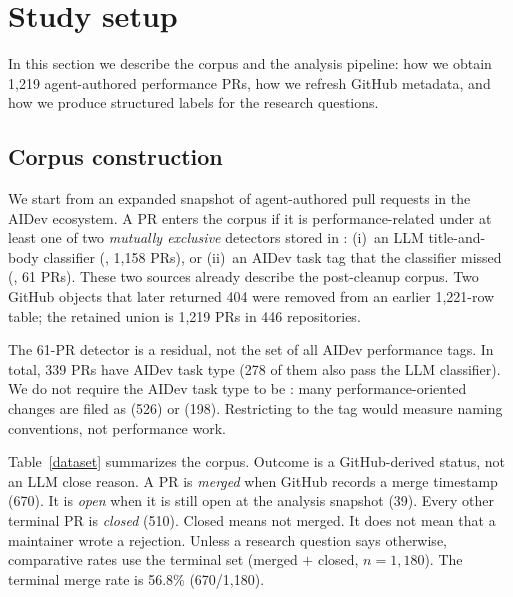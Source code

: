 \section{Study setup}
\label{approach}

In this section we describe the corpus and the analysis pipeline: how we obtain 1,219 agent-authored performance PRs, how we refresh GitHub metadata, and how we produce structured labels for the research questions.

\subsection{Corpus construction}

We start from an expanded snapshot of agent-authored pull requests in the AIDev ecosystem. A PR enters the corpus if it is performance-related under at least one of two \emph{mutually exclusive} detectors stored in :
(i)~an LLM title-and-body classifier (, 1,158 PRs), or
(ii)~an AIDev  task tag that the classifier missed (, 61 PRs).
These two sources already describe the post-cleanup corpus. Two GitHub objects that later returned 404 were removed from an earlier 1,221-row table; the retained union is 1,219 PRs in 446 repositories.

The 61-PR detector is a residual, not the set of all AIDev performance tags. In total, 339 PRs have AIDev task type  (278 of them also pass the LLM classifier). We do not require the AIDev task type to be : many performance-oriented changes are filed as  (526) or  (198). Restricting to the  tag would measure naming conventions, not performance work.

Table~\ref{dataset} summarizes the corpus. Outcome is a GitHub-derived status, not an LLM close reason. A PR is \emph{merged} when GitHub records a merge timestamp (670). It is \emph{open} when it is still open at the analysis snapshot (39). Every other terminal PR is \emph{closed} (510). Closed means not merged. It does not mean that a maintainer wrote a rejection. Unless a research question says otherwise, comparative rates use the terminal set (merged \(+\) closed, \(n=1{,}180\)). The terminal merge rate is 56.8\% (670/1{,}180).

